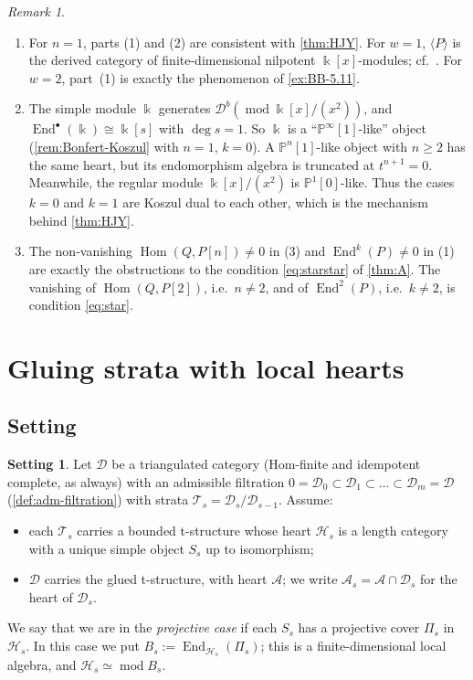 \documentclass[11pt,reqno]{amsart}
\theoremstyle{plain}
\theoremstyle{definition}
\newtheorem{setting}[theorem]{Setting}
\theoremstyle{remark}
\newtheorem{remark}[theorem]{Remark}
\newcommand{\kk}{\Bbbk}
\DeclareMathOperator{\Hom}{Hom}
\DeclareMathOperator{\End}{End}
\newcommand{\modd}{\operatorname{mod}}
\newcommand{\Db}{\mathcal{D}^b}
\newcommand{\thick}[1]{\langle #1\rangle}
\newcommand{\Pn}[2]{\mathbb{P}^{#1}[#2]}
\newcommand{\cD}{\mathcal{D}}
\newcommand{\cA}{\mathcal{A}}
\newcommand{\cH}{\mathcal{H}}
\newcommand{\cT}{\mathcal{T}}
\begin{document}
\begin{remark}\label{rem:koszul}
\leavevmode
\begin{enumerate}
\item For $n=1$, parts (1) and (2) are consistent with \cref{thm:HJY}. For $w=1$, $\thick P$ is the derived category of finite-dimensional nilpotent $\kk[x]$-modules; cf.\ \cite[Lemma~3.11(3), Cor.~4.16(2)]{Bonf26}. For $w=2$, part~(1) is exactly the phenomenon of \cref{ex:BB-5.11}.
\item The simple module $\kk$ generates $\Db(\modd\kk[x]/(x^2))$, and $\End^\bullet(\kk)\cong\kk[s]$ with $\deg s=1$. So $\kk$ is a ``$\Pn\infty1$-like'' object (\cref{rem:Bonfert-Koszul} with $n=1$, $k=0$). A $\Pn n1$-like object with $n\ge2$ has the same heart, but its endomorphism algebra is truncated at $t^{n+1}=0$. Meanwhile, the regular module $\kk[x]/(x^2)$ is $\Pn10$-like. Thus the cases $k=0$ and $k=1$ are Koszul dual to each other, which is the mechanism behind \cref{thm:HJY}.
\item The non-vanishing $\Hom(Q,P[n])\ne0$ in (3) and $\End^{k}(P)\ne0$ in (1) are exactly the obstructions to the condition \eqref{eq:starstar} of \cref{thm:A}. The vanishing of $\Hom(Q,P[2])$, i.e.\ $n\ne2$, and of $\End^2(P)$, i.e.\ $k\ne2$, is condition \eqref{eq:star}.
\end{enumerate}
\end{remark}

\section{Gluing strata with local hearts}\label{sec:gluing}

\subsection{Setting}

\begin{setting}\label{set:local}
Let $\cD$ be a triangulated category (Hom-finite and idempotent complete, as always) with an admissible filtration $0=\cD_0\subset\cD_1\subset\dots\subset\cD_m=\cD$ (\cref{def:adm-filtration}) with strata $\cT_s=\cD_s/\cD_{s-1}$. Assume:
\begin{itemize}
\item each $\cT_s$ carries a bounded t-structure whose heart $\cH_s$ is a length category with a unique simple object $S_s$ up to isomorphism;
\item $\cD$ carries the glued t-structure, with heart $\cA$; we write $\cA_s=\cA\cap\cD_s$ for the heart of $\cD_s$.
\end{itemize}
We say that we are in the \emph{projective case} if each $S_s$ has a projective cover $\Pi_s$ in $\cH_s$. In this case we put $B_s:=\End_{\cH_s}(\Pi_s)$; this is a finite-dimensional local algebra, and $\cH_s\simeq\modd B_s$.
\end{setting}
\end{document}

